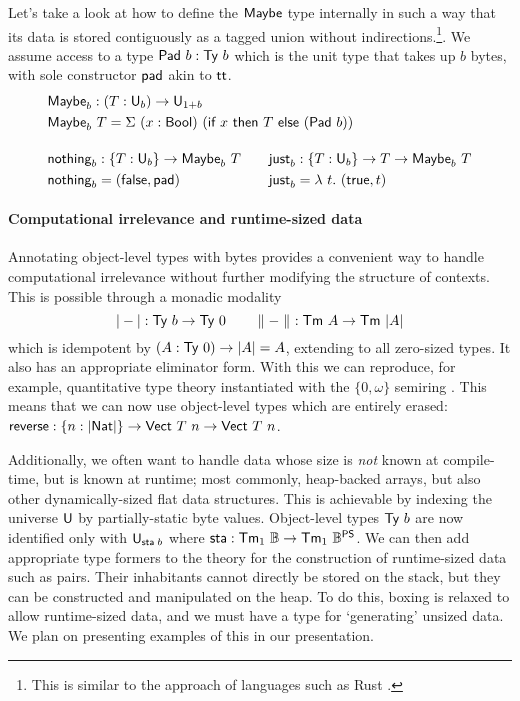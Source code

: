 Let's take a look at how to define the \(\textsf{Maybe}\) type internally in
such a way that its data is stored contiguously as a tagged union without indirections.\footnote{This
	is similar to the approach of languages such as Rust \cite{rust-option}.}.
We assume access to a type $\textsf{Pad}\ b : \textsf{Ty}\ b$ which is the unit
type that takes up $b$ bytes, with sole constructor $\textsf{pad}$ akin to
$\textsf{tt}$.
\[
	\begin{aligned}
		 & \syn{Maybe}_b : (T : \univ_b) \to \univ_{1 + b}                                                                                  \\
		 & \syn{Maybe}_b\ T = \Sigma\ (x : \syn{Bool})\ (\syn{if}\ x\ \syn{then}\ T\ \syn{else}\ (\syn{Pad}\ b))                            \\[1em]
		 & \begin{alignedat}{2}
			    & \syn{nothing}_b : \{T : \univ_b\} \to \syn{Maybe}_b\ T  \qquad &  & \syn{just}_b : \{T : \univ_b\} \to T \to \syn{Maybe}_b\ T \\
			    & \syn{nothing}_b = (\syn{false}, \syn{pad})                     &  & \syn{just}_b = \lambda\ t.\  (\syn{true}, t)
		   \end{alignedat}
	\end{aligned}
\]

\paragraph{Computational irrelevance and runtime-sized data}

Annotating object-level types with bytes provides a convenient way to handle computational
irrelevance without further modifying the structure of contexts. This is possible through
a monadic modality
\[
	| - | : \textsf{Ty}\ b \to \textsf{Ty}\ 0 \qquad \parallel - \parallel\ : \textsf{Tm}\ A \to \textsf{Tm}\ | A |
\]
which is idempotent by $(A : \textsf{Ty}\ 0) \to | A | = A$, extending to all zero-sized types.
It also has an appropriate eliminator form.
With this we can
reproduce, for example, quantitative type theory instantiated with the $\{0,\omega\}$ semiring
\cite{Atkey2018-pj}. This means that we can now use object-level types which are
entirely erased: $\textsf{reverse} : \{n : | \textsf{Nat} |\} \to \textsf{Vect}\ T\ n \to \textsf{Vect}\ T\ n$.

Additionally, we often want to handle data whose size is \emph{not} known at
compile-time, but is known at runtime; most commonly, heap-backed arrays, but
also other dynamically-sized flat data structures. This is achievable by
indexing the universe $\textsf{U}$ by partially-static \cite{Yallop2018-zw} byte
values. Object-level types $\textsf{Ty}\ b$ are now identified only with
$\textsf{U}_{\textsf{sta}\;b}$ where $\textsf{sta} : \textsf{Tm}_1\ \mathbb{B} \to \textsf{Tm}_1\
	\mathbb{B}^{\textsf{PS}}$. We can then add appropriate type formers to the theory
for the construction of runtime-sized data such as pairs. Their inhabitants
cannot directly be stored on the stack, but they can be constructed and
manipulated on the heap. To do this, boxing is relaxed to allow runtime-sized
data, and we must have a type for `generating' unsized data. We plan on presenting
examples of this in our presentation.

